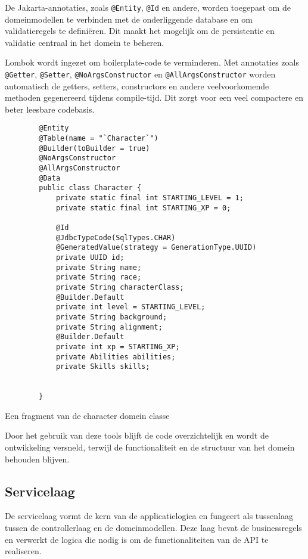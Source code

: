 De Jakarta-annotaties, zoals \texttt{@Entity}, \texttt{@Id} en andere, worden toegepast om de domeinmodellen te verbinden met de onderliggende database en om validatieregels te definiëren. Dit maakt het mogelijk om de persistentie en validatie centraal in het domein te beheren.

Lombok wordt ingezet om boilerplate-code te verminderen. Met annotaties zoals \texttt{@Getter}, \texttt{@Setter}, \texttt{@NoArgsConstructor} en \texttt{@AllArgsConstructor} worden automatisch de getters, setters, constructors en andere veelvoorkomende methoden gegenereerd tijdens compile-tijd. Dit zorgt voor een veel compactere en beter leesbare codebasis.

\begin{listing}
    \begin{verbatim}
        @Entity
        @Table(name = "`Character`")
        @Builder(toBuilder = true)
        @NoArgsConstructor
        @AllArgsConstructor
        @Data
        public class Character {
            private static final int STARTING_LEVEL = 1;
            private static final int STARTING_XP = 0;
            
            @Id
            @JdbcTypeCode(SqlTypes.CHAR)
            @GeneratedValue(strategy = GenerationType.UUID)
            private UUID id;
            private String name;
            private String race;
            private String characterClass;
            @Builder.Default
            private int level = STARTING_LEVEL;
            private String background;
            private String alignment;
            @Builder.Default
            private int xp = STARTING_XP;
            private Abilities abilities;
            private Skills skills;
            
            
        }
    \end{verbatim}
    \caption[domainClassExample]{Een fragment van de  character domein classe}
\end{listing}

Door het gebruik van deze tools blijft de code overzichtelijk en wordt de ontwikkeling versneld, terwijl de functionaliteit en de structuur van het domein behouden blijven.

\subsection{Servicelaag}

De servicelaag vormt de kern van de applicatielogica en fungeert als tussenlaag tussen de controllerlaag en de domeinmodellen. Deze laag bevat de businessregels en verwerkt de logica die nodig is om de functionaliteiten van de API te realiseren.

